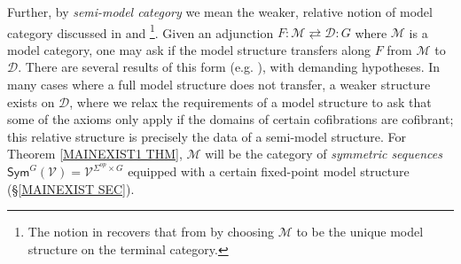\documentclass[a4paper,10pt
,draft
]{article}%
\numberwithin{equation}{section}
\numberwithin{figure}{section}
\theoremstyle{definition} %
\newcommand{\Sym}{\ensuremath{\mathsf{Sym}}}%
\newcommand{\V}{\ensuremath{\mathcal V}}
\newcommand{\1}{\ensuremath{\mathbbm 1}}%
\begin{document}
Further, by \textit{semi-model category}
we mean the weaker, relative notion of model category
discussed in \cite[\S 2.2]{WY18} and \cite[\S 12.1]{Fre09}\footnote{The notion in \cite{WY18} recovers that from \cite{Fre09} by choosing $\mathcal M$ to be the unique model structure on the terminal category.}.
Given an adjunction $F \colon \mathcal M \rightleftarrows \mathcal D \colon G$
where $\mathcal M$ is a model category,
one may ask if the model structure transfers along $F$ from $\mathcal M$ to $\mathcal D$.
There are several results of this form (e.g. \cite[Thm. 11.3.2]{Hi03}),
with demanding hypotheses.
In many cases where a full model structure does not transfer,
a weaker structure exists on $\mathcal D$,
where we relax the requirements of a model structure to ask that
some of the axioms only apply if the domains of certain cofibrations are cofibrant;
this relative structure is precisely the data of a semi-model structure.
For Theorem \ref{MAINEXIST1 THM}, $\mathcal M$ will be the category of \textit{symmetric sequences}
$\Sym^G(\V) = \V^{\Sigma^{op} \times G}$ equipped with a certain fixed-point model structure (\S \ref{MAINEXIST SEC}).



\end{document}

